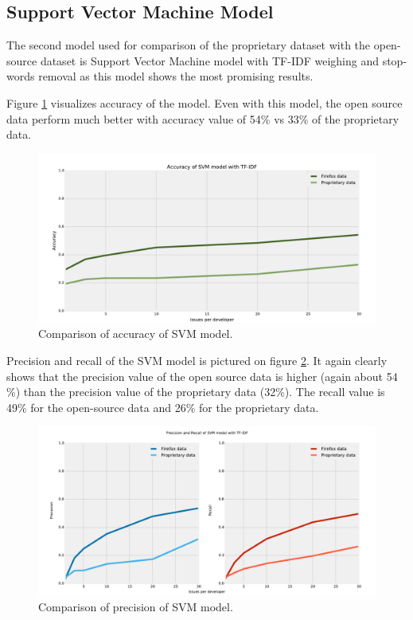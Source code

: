 \subsection{Support Vector Machine Model}

The second model used for comparison of the proprietary dataset with the open-source dataset is Support Vector Machine model with TF-IDF weighing and stop-words removal as this model shows the most promising results.

Figure \ref{fig:results.datasets.svm_accuracy} visualizes accuracy of the model. Even with this model, the open source data perform much better with accuracy value of 54\% vs 33\% of the proprietary data.

\begin{figure}[htbp]
    \centering
        \includegraphics[width=\textwidth]{./images/prop_vs_os/svm_accuracy.pdf}
    \caption{Comparison of accuracy of SVM model.}
    \label{fig:results.datasets.svm_accuracy}
\end{figure}

Precision and recall of the SVM model is pictured on figure \ref{fig:results.datasets.svm_pr}. It again clearly shows that the precision value of the open source data is higher (again about 54 \%) than the precision value of the proprietary data (32\%). The recall value is 49\% for the open-source data and 26\% for the proprietary data.

\begin{figure}[htbp]
    \centering
        \includegraphics[width=\textwidth]{./images/prop_vs_os/svm_precision_and_recall.pdf}
    \caption{Comparison of precision of SVM model.}
    \label{fig:results.datasets.svm_pr}
\end{figure}

